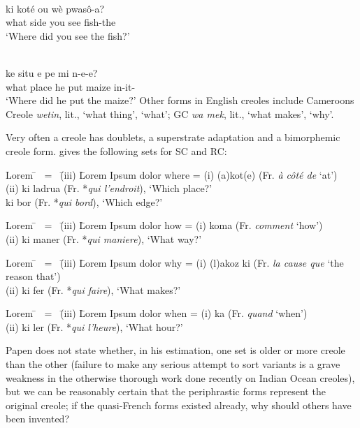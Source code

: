 \ea\label{ex:2:80}
\\
\gll ki koté ou wè pwas{\^o}-a?\\
what side you see fish-the\\
\glt `Where did you see the fish?'
\z

\ea\label{ex:2:81}
\\
\gll ke situ e pe mi n-e-e?\\
what place he put maize in-it-\QP\\
\glt `Where did he put the maize?'
\z
Other forms in English creoles include Cameroons Creole \textit{wetin}, lit., `what thing', `what'; GC \textit{wa mek}, lit., `what makes', `why'.

Very often a creole has doublets, a superstrate adaptation and a bimorphemic creole form. \citet[509]{Papen1978} gives the following sets for SC and RC:


\ea\label{ex:2:82} \begin{tabbing}	Lorem \= ~{\rm =}~ \= {\rm (iii)} \= Lorem Ipsum dolor \kill
					where \> {\rm =} \> {\rm (i)} \> (a)kot(e) {\rm (Fr. {\it à côté de} `at')}\\
					\> \> {\rm (ii)} \> ki ladrua {\rm (Fr. *{\it qui l'endroit}), `Which place?'}\\
					\> \> \> ki bor {\rm (Fr. *{\it qui bord}), `Which edge?'}
					\end{tabbing}\z

\ea\label{ex:2:83} \begin{tabbing}	Lorem \= ~{\rm =}~ \= {\rm (iii)} \= Lorem Ipsum dolor \kill
					how \> {\rm =} \> {\rm (i)} \> koma {\rm (Fr. {\it comment} `how')}\\
					\> \> {\rm (ii)} \> ki maner {\rm (Fr. *{\it qui maniere}), `What way?'}\end{tabbing}\z

\ea\label{ex:2:84} \begin{tabbing}	Lorem \= ~{\rm =}~ \= {\rm (iii)} \= Lorem Ipsum dolor \kill
					why \> {\rm =} \> {\rm (i)} \> (l)akoz ki {\rm (Fr. {\it la cause que} `the reason that')}\\
					\> \> {\rm (ii)} \> ki fer {\rm (Fr. *{\it qui faire}), `What makes?'}\end{tabbing}\z

\ea\label{ex:2:85} \begin{tabbing}	Lorem \= ~{\rm =}~ \= {\rm (iii)} \= Lorem Ipsum dolor \kill
					when \> {\rm =} \> {\rm (i)} \> ka {\rm (Fr. {\it quand} `when')}\\
					\> \> {\rm (ii)} \> ki ler {\rm (Fr. *{\it qui l'heure}), `What hour?'}\end{tabbing}\z
Papen does not state whether, in his estimation, one set is older or more creole than the other (failure to make any serious attempt to sort variants is a grave weakness in the otherwise thorough work done recently on Indian Ocean creoles), but we can be reasonably certain that the periphrastic forms represent the original creole; if the quasi-French forms existed already, why should others have been invented?

